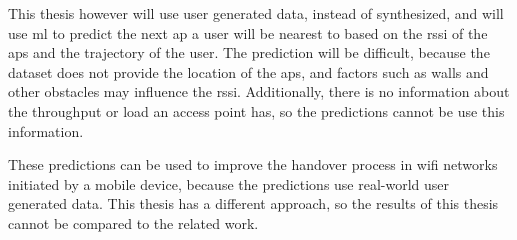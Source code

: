 This thesis however will use user generated data, instead of synthesized, and will use \ac{ml} to predict the next \ac{ap} a user will be nearest to based on the \ac{rssi} of the \acp{ap} and the trajectory of the user.
The prediction will be difficult, because the dataset does not provide the location of the \acp{ap}, and factors such as walls and other obstacles may influence the \ac{rssi}.
Additionally, there is no information about the throughput or load an access point has, so the predictions cannot be use this information.

These predictions can be used to improve the handover process in \ac{wifi} networks initiated by a mobile device, because the predictions use real-world user generated data.
This thesis has a different approach, so the results of this thesis cannot be compared to the related work.

